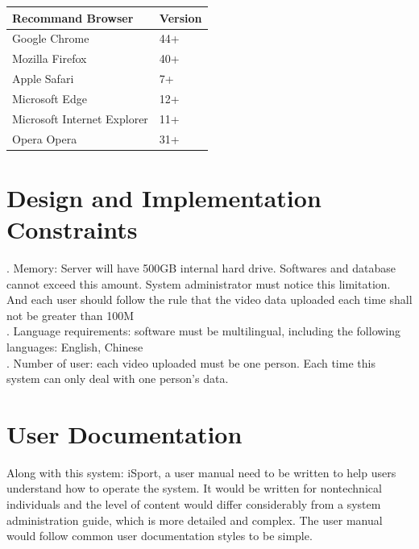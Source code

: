 \documentclass[16pt]{scrreprt}
\begin{document}
 
\begin{center}
    \begin{tabular}{p{7cm}p{7cm}}
        \hline
        Recommand Browser & Version\\
        \hline
        Google Chrome &  44+\\
        \hline
        Mozilla Firefox & 40+\\
        \hline
        Apple Safari & 7+\\
        \hline
        Microsoft Edge & 12+\\
        \hline
        Microsoft Internet Explorer & 11+\\
        \hline
        Opera Opera & 31+\\
        \hline

 
    \end{tabular}
\end{center}

 
\section{Design and Implementation Constraints}

 
. Memory: Server will have 500GB internal hard drive. Softwares and database cannot exceed this amount. System administrator must notice this limitation. And each user should follow the rule that the video data uploaded each time shall not be greater than 100M\\

 
. Language requirements: software must be multilingual, including the following languages: English, Chinese\\

 
. Number of user: each video uploaded must be one person. Each time this system can only deal with one person's data.\\

 
\section{User Documentation}

 
Along with this system: iSport, a user manual need to be written to help users understand how to operate the system. It would be written for nontechnical individuals and the level of content would differ considerably from a system administration guide, which is more detailed and complex. The user manual would follow common user documentation styles to be simple.\\
\end{document}
